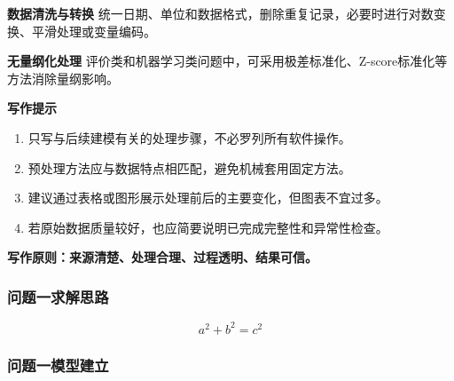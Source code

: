  \textbf{数据清洗与转换} 统一日期、单位和数据格式，删除重复记录，必要时进行对数变换、平滑处理或变量编码。

 \textbf{无量纲化处理} 评价类和机器学习类问题中，可采用极差标准化、Z-score标准化等方法消除量纲影响。

\textbf{写作提示}

\begin{enumerate}[label=(\arabic*), leftmargin=2.5em, itemsep=0.3em]
\item 只写与后续建模有关的处理步骤，不必罗列所有软件操作。

\item 预处理方法应与数据特点相匹配，避免机械套用固定方法。

\item 建议通过表格或图形展示处理前后的主要变化，但图表不宜过多。

\item 若原始数据质量较好，也应简要说明已完成完整性和异常性检查。
\end{enumerate}

\textbf{写作原则：来源清楚、处理合理、过程透明、结果可信。}

\subsubsection{问题一求解思路}
\begin{equation}                                %
  a^2 + b^2 = c^2
\end{equation}
\subsubsection{问题一模型建立}
